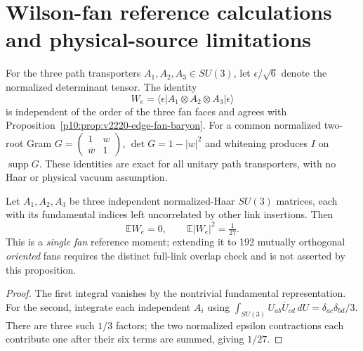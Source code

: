 \documentclass[12pt,a4paper]{article}
\begin{document}
\section{Wilson-fan reference calculations and physical-source limitations}
\label{p12:sec:v365-wilson-reference-tests}
For the three path transporters $A_1,A_2,A_3\in SU(3)$,
let $\epsilon/\sqrt6$ denote the normalized determinant tensor.
The identity
\[
  W_e=\langle\epsilon|A_1\otimes A_2\otimes A_3|\epsilon\rangle
\]
is independent of the order of the three fan faces and agrees
with Proposition~\ref{p10:prop:v2220-edge-fan-baryon}.
For a common normalized two-root Gram
$G=\left(\begin{smallmatrix}1&w\\\bar w&1\end{smallmatrix}\right)$,
$\det G=1-|w|^2$ and whitening produces $I$ on $\operatorname{supp}G$.
These identities are exact for all unitary path transporters,
with no Haar or physical vacuum assumption.

\begin{proposition}
\label{p12:prop:v365-haar-three-path-second-moment}
Let $A_1,A_2,A_3$ be three independent normalized-Haar $SU(3)$
matrices, each with its fundamental indices left uncorrelated by
other link insertions.  Then
\[
\boxed{\mathbb E W_e=0,\qquad \mathbb E|W_e|^2=\tfrac1{27}.}
\]
This is a \emph{single fan} reference moment; extending it to
192 mutually orthogonal \emph{oriented} fans requires the distinct
full-link overlap check and is not asserted by this proposition.
\end{proposition}
\begin{proof}
The first integral vanishes by the nontrivial fundamental
representation.  For the second, integrate each independent
$A_i$ using
$\int_{SU(3)}U_{ab}\overline U_{cd}\,dU
 =\delta_{ac}\delta_{bd}/3$.  There are three such $1/3$
factors; the two normalized epsilon contractions each contribute
one after their six terms are summed, giving $1/27$.
\end{proof}
\end{document}
